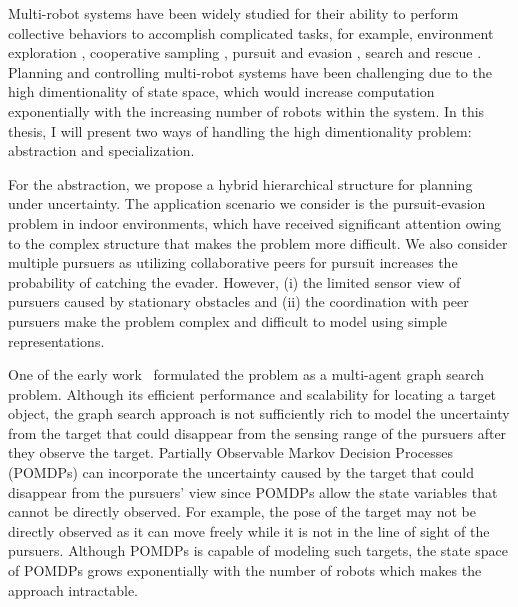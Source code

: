 \documentclass[../main.tex]{subfiles}
\begin{document}
Multi-robot systems have been widely studied for their ability to perform collective behaviors to accomplish complicated tasks, for example, environment exploration \cite{burgard2005coordinated}, cooperative sampling \cite{luo2018adaptive}, pursuit and evasion \cite{hollinger2009efficient}, search and rescue \cite{kantor2003distributed}. Planning and controlling multi-robot systems have been challenging due to the high dimentionality of state space, which would increase computation exponentially with the increasing number of robots within the system. In this thesis, I will present two ways of handling the high dimentionality problem: abstraction and specialization. 

For the abstraction, we propose a hybrid hierarchical structure for planning under uncertainty. The application scenario we consider is the pursuit-evasion problem in indoor environments, which have received significant attention owing to the complex structure that makes the problem more difficult. We also consider multiple pursuers as utilizing collaborative peers for pursuit increases the probability of catching the evader. However, (i) the limited sensor view of pursuers caused by stationary obstacles and (ii) the coordination with peer pursuers make the problem complex and difficult to model using simple representations.

One of the early work~\cite{hollinger2009efficient} formulated the problem as a multi-agent graph search problem. Although its efficient performance and scalability for locating a target object, the graph search approach is not sufficiently rich to model the uncertainty from the target that could disappear from the sensing range of the pursuers after they observe the target. Partially Observable Markov Decision Processes (POMDPs) can incorporate the uncertainty caused by the target that could disappear from the pursuers' view since POMDPs allow the state variables that cannot be directly observed. For example, the pose of the target may not be directly observed as it can move freely while it is not in the line of sight of the pursuers. Although POMDPs is capable of modeling such targets, the state space of POMDPs grows exponentially with the number of robots which makes the approach intractable.
\end{document}
